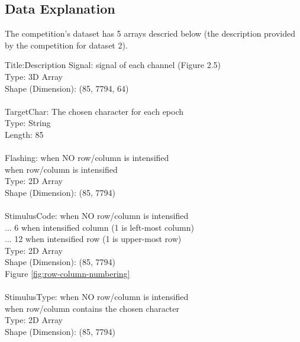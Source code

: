 \subsection{Data Explanation}
\label{subsection:data-explanation}
The competition's dataset has 5 arrays descried below (the description provided by the competition for dataset 2).
\begin{tabbing}
    Title:\quad \quad \quad \quad \quad \=Description\kill
    Signal:         \>signal of each channel (Figure 2.5)\\
                    \>Type: 3D Array\\
                    \>Shape (Dimension): (85, 7794, 64)\\
    \newline\\
    TargetChar:     \>The chosen character for each epoch\\
                    \>Type: String\\
                    \>Length: 85\\
    \newline\\
    Flashing:	    	when NO row/column is intensified\\
                    	when row/column is intensified\\
                    \>Type: 2D Array\\
                    \>Shape (Dimension): (85, 7794)\\
    \newline\\
    StimulusCode:		when NO row/column is intensified\\
                     ... 6	when intensified column (1 is left-most column)\\
                     ... 12	when intensified row (1 is upper-most row)\\
                    \>Type: 2D Array\\
                    \>Shape (Dimension): (85, 7794)\\
                    \>Figure \ref{fig:row-column-numbering}\\
    \newline\\
    StimulusType:		when NO row/column is intensified\\
    		        	when row/column contains the chosen character\\
                    \>Type: 2D Array\\
                    \>Shape (Dimension): (85, 7794)\\
\end{tabbing}\par
